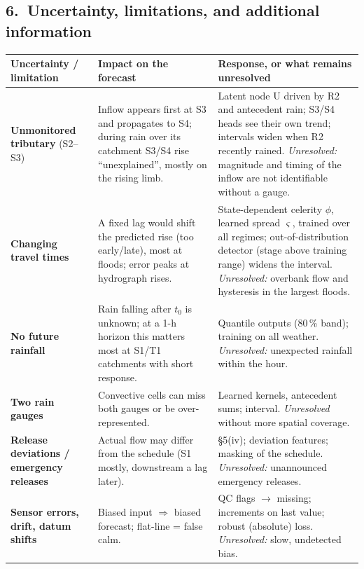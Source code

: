 \subsection*{6.\ Uncertainty, limitations, and additional information}
\begin{table}[H]\centering\scriptsize
\renewcommand{\arraystretch}{1.08}
\begin{tabularx}{\linewidth}{@{}>{\raggedright\arraybackslash}p{3.0cm}>{\raggedright\arraybackslash}X>{\raggedright\arraybackslash}X@{}}
\toprule
Uncertainty / limitation & Impact on the forecast & Response, or what remains unresolved \\ \midrule
\textbf{Unmonitored tributary} (S2--S3) & Inflow appears first at S3 and propagates to S4; during rain over its catchment S3/S4 rise ``unexplained'', mostly on the rising limb. & Latent node U driven by R2 and antecedent rain; S3/S4 heads see their own trend; intervals widen when R2 recently rained. \emph{Unresolved:} magnitude and timing of the inflow are not identifiable without a gauge.\\
\textbf{Changing travel times} & A fixed lag would shift the predicted rise (too early/late), most at floods; error peaks at hydrograph rises. & State-dependent celerity $\phi$, learned spread $\varsigma$, trained over all regimes; out-of-distribution detector (stage above training range) widens the interval. \emph{Unresolved:} overbank flow and hysteresis in the largest floods.\\
\textbf{No future rainfall} & Rain falling after $t_0$ is unknown; at a 1-h horizon this matters most at S1/T1 catchments with short response. & Quantile outputs (80\,\% band); training on all weather. \emph{Unresolved:} unexpected rainfall within the hour.\\
\textbf{Two rain gauges} & Convective cells can miss both gauges or be over-represented. & Learned kernels, antecedent sums; interval. \emph{Unresolved} without more spatial coverage.\\
\textbf{Release deviations / emergency releases} & Actual flow may differ from the schedule (S1 mostly, downstream a lag later). & \S5(iv); deviation features; masking of the schedule. \emph{Unresolved:} unannounced emergency releases.\\
\textbf{Sensor errors, drift, datum shifts} & Biased input $\Rightarrow$ biased forecast; flat-line = false calm. & QC flags $\to$ missing; increments on last value; robust (absolute) loss. \emph{Unresolved:} slow, undetected bias.\\

\end{tabularx}
\end{table}
